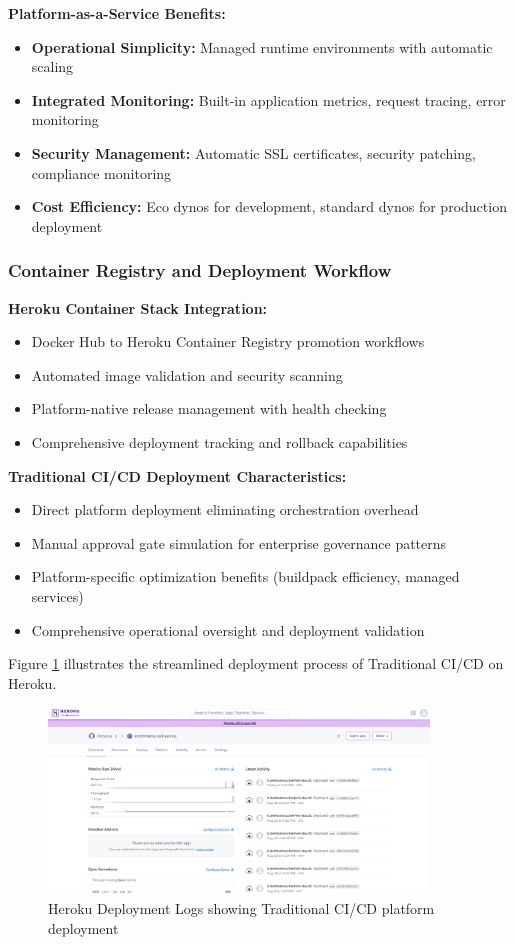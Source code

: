 \textbf{Platform-as-a-Service Benefits:}
\begin{itemize}
\item \textbf{Operational Simplicity:} Managed runtime environments with automatic scaling
\item \textbf{Integrated Monitoring:} Built-in application metrics, request tracing, error monitoring
\item \textbf{Security Management:} Automatic SSL certificates, security patching, compliance monitoring
\item \textbf{Cost Efficiency:} Eco dynos for development, standard dynos for production deployment
\end{itemize}

\subsubsection{Container Registry and Deployment Workflow}

\textbf{Heroku Container Stack Integration:}
\begin{itemize}
\item Docker Hub to Heroku Container Registry promotion workflows
\item Automated image validation and security scanning
\item Platform-native release management with health checking
\item Comprehensive deployment tracking and rollback capabilities
\end{itemize}

\textbf{Traditional CI/CD Deployment Characteristics:}
\begin{itemize}
\item Direct platform deployment eliminating orchestration overhead
\item Manual approval gate simulation for enterprise governance patterns
\item Platform-specific optimization benefits (buildpack efficiency, managed services)
\item Comprehensive operational oversight and deployment validation
\end{itemize}

Figure \ref{fig:heroku-deployment-logs} illustrates the streamlined deployment process of Traditional CI/CD on Heroku.

\begin{figure}[H]
\centering
\includegraphics[width=0.9\textwidth]{figures/chapter5/heroku-deployment-logs.png}
\caption{Heroku Deployment Logs showing Traditional CI/CD platform deployment}
\label{fig:heroku-deployment-logs}
\end{figure}


